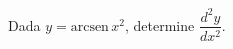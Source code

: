 \begin{frame}
  \begin{columns}[onlytextwidth]
    \begin{column}{0.65\textwidth}\vspace{-0.5cm}
      \begin{example}
        Dada $y = \mbox{arcsen}\,{x^{2}}$, determine $\dfrac{d^{2}y}{dx^{2}}$.
      \end{example}
    \end{column}
    \begin{column}{0.35\textwidth}\vspace{-0.75cm}
    \end{column}
  \end{columns}
\end{frame}